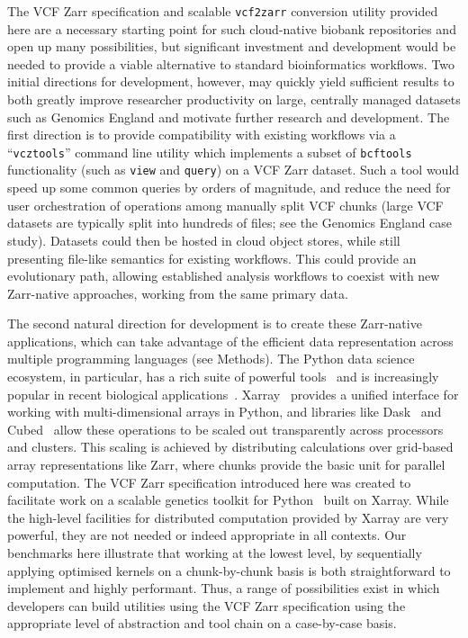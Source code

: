 \documentclass[a4paper,num-refs]{oup-contemporary}
\begin{document}
The VCF Zarr specification and scalable \texttt{vcf2zarr} conversion utility
provided here are a necessary starting point for such cloud-native
biobank repositories and open up many possibilities,
but significant investment and development would be needed 
to provide a viable alternative to standard bioinformatics workflows. 
Two initial directions for development, however, may quickly
yield sufficient results to both greatly improve researcher productivity on 
large, centrally managed datasets such as Genomics England
and motivate further research and development.
The first direction is to provide compatibility with existing 
workflows via a ``\texttt{vcztools}'' command line utility which 
implements a subset of \texttt{bcftools} functionality (such as 
\texttt{view} and \texttt{query}) on a VCF Zarr dataset.
Such a tool would speed up some common queries by orders 
of magnitude, and reduce the need for user orchestration of 
operations among manually split VCF chunks (large VCF datasets
are typically split into hundreds of files; see the Genomics
England case study). Datasets could then be hosted in cloud
object stores, while still presenting file-like semantics
for existing workflows. This could provide an evolutionary path,
allowing established analysis workflows to coexist with new Zarr-native
approaches, working from the same primary data.

The second natural direction for development is to create
these Zarr-native applications, which can take advantage
of the efficient data representation
across multiple programming languages (see Methods).
The Python data science ecosystem, in particular,
has a rich suite of powerful tools~\cite[e.g.][]{
mckinney2010data,
lam2015numba,
kluyver2016jupyter,
harris2020array,
virtanen2020scipy} 
and is increasingly
popular in recent biological applications~\citep[e.g.][]{
abdennur2020cooler,
rand2022bionumpy,
open2c2024bioframe,
hou2024admix}.
Xarray~\cite{hoyer2017xarray} provides a unified interface for working 
with multi-dimensional arrays
in Python, and libraries like Dask~\cite{rocklin2015dask}  
and Cubed~\cite{cubed2024} allow these operations to be
scaled out transparently across processors and clusters. 
This scaling is achieved by distributing calculations over 
grid-based array representations like Zarr, where chunks
provide the basic unit for parallel computation.
The VCF Zarr specification introduced here was created 
to facilitate work on a scalable genetics toolkit for 
Python~\cite{sgkit2024} built on Xarray. 
While the high-level facilities for distributed 
computation provided by Xarray 
are very powerful, they are not needed or indeed
appropriate in all contexts. Our benchmarks here 
illustrate that working at the lowest level, 
by sequentially applying optimised kernels on a chunk-by-chunk
basis is both straightforward to implement and highly performant.
Thus, a range of possibilities exist in which developers 
can build utilities using the VCF Zarr specification
using the appropriate level of abstraction and tool chain
on a case-by-case basis.
\end{document}
